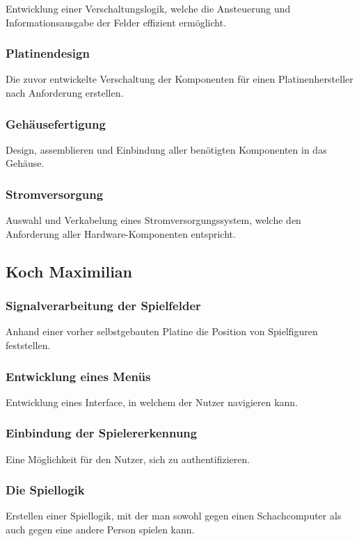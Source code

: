 Entwicklung einer Verschaltungslogik, welche die Ansteuerung und Informationsausgabe der Felder effizient ermöglicht.

\subsubsection{Platinendesign}

Die zuvor entwickelte Verschaltung der Komponenten für einen Platinenhersteller nach Anforderung erstellen.

\subsubsection{Gehäusefertigung}

Design, assemblieren und Einbindung aller benötigten Komponenten in das Gehäuse.

\subsubsection{Stromversorgung}

Auswahl und Verkabelung eines Stromversorgungssystem, welche den Anforderung aller Hardware-Komponenten entspricht.


\subsection{Koch Maximilian}

\subsubsection{Signalverarbeitung der Spielfelder}
Anhand einer vorher selbstgebauten Platine die Position von Spielfiguren feststellen.

\subsubsection{Entwicklung eines Menüs}
Entwicklung eines Interface, in welchem der Nutzer navigieren kann.

\subsubsection{Einbindung der Spielererkennung}
Eine Möglichkeit für den Nutzer, sich zu authentifizieren.

\subsubsection{Die Spiellogik}
Erstellen einer Spiellogik, mit der man sowohl gegen einen Schachcomputer als auch gegen eine andere Person 
spielen kann.


